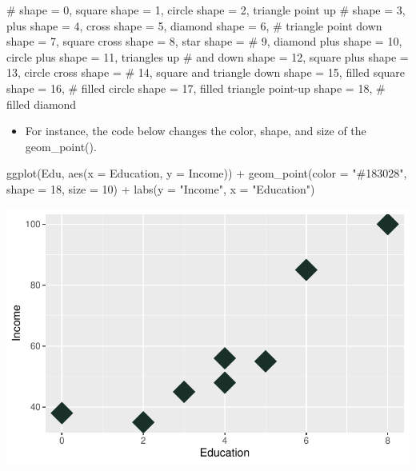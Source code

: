 \documentclass[
  letterpaper,
  DIV=11,
  numbers=noendperiod]{scrreprt}
\newenvironment{Shaded}{\begin{snugshade}}{\end{snugshade}}
\newcommand{\AttributeTok}[1]{\textcolor[rgb]{0.40,0.45,0.13}{#1}}
\newcommand{\CommentTok}[1]{\textcolor[rgb]{0.37,0.37,0.37}{#1}}
\newcommand{\DecValTok}[1]{\textcolor[rgb]{0.68,0.00,0.00}{#1}}
\newcommand{\FunctionTok}[1]{\textcolor[rgb]{0.28,0.35,0.67}{#1}}
\newcommand{\NormalTok}[1]{\textcolor[rgb]{0.00,0.23,0.31}{#1}}
\newcommand{\SpecialCharTok}[1]{\textcolor[rgb]{0.37,0.37,0.37}{#1}}
\newcommand{\StringTok}[1]{\textcolor[rgb]{0.13,0.47,0.30}{#1}}
\providecommand{\tightlist}{%
  \setlength{\itemsep}{0pt}\setlength{\parskip}{0pt}}\usepackage{longtable,booktabs,array}
\begin{document}
\begin{Shaded}
\begin{Highlighting}[]
\CommentTok{\# shape = 0, square shape = 1, circle shape = 2, triangle point up}
\CommentTok{\# shape = 3, plus shape = 4, cross shape = 5, diamond shape = 6,}
\CommentTok{\# triangle point down shape = 7, square cross shape = 8, star shape =}
\CommentTok{\# 9, diamond plus shape = 10, circle plus shape = 11, triangles up}
\CommentTok{\# and down shape = 12, square plus shape = 13, circle cross shape =}
\CommentTok{\# 14, square and triangle down shape = 15, filled square shape = 16,}
\CommentTok{\# filled circle shape = 17, filled triangle point{-}up shape = 18,}
\CommentTok{\# filled diamond}
\end{Highlighting}
\end{Shaded}

\begin{itemize}
\tightlist
\item
  For instance, the code below changes the color, shape, and size of the
  geom\_point().
\end{itemize}

\begin{Shaded}
\begin{Highlighting}[]
\FunctionTok{ggplot}\NormalTok{(Edu, }\FunctionTok{aes}\NormalTok{(}\AttributeTok{x =}\NormalTok{ Education, }\AttributeTok{y =}\NormalTok{ Income)) }\SpecialCharTok{+} \FunctionTok{geom\_point}\NormalTok{(}\AttributeTok{color =} \StringTok{"\#183028"}\NormalTok{,}
    \AttributeTok{shape =} \DecValTok{18}\NormalTok{, }\AttributeTok{size =} \DecValTok{10}\NormalTok{) }\SpecialCharTok{+} \FunctionTok{labs}\NormalTok{(}\AttributeTok{y =} \StringTok{"Income"}\NormalTok{, }\AttributeTok{x =} \StringTok{"Education"}\NormalTok{)}
\end{Highlighting}
\end{Shaded}

\includegraphics{dataviz_files/figure-pdf/unnamed-chunk-47-1.pdf}
\end{document}

